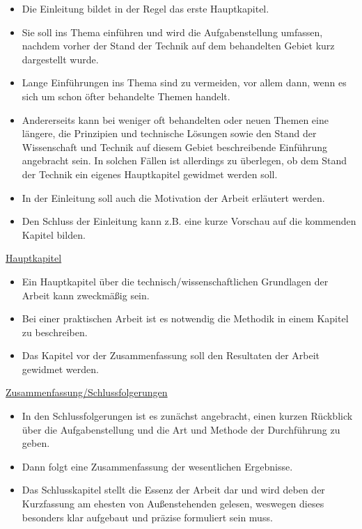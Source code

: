 \begin{itemize}
    \item Die Einleitung bildet in der Regel das erste Hauptkapitel.
    \item Sie soll ins Thema einführen und wird die Aufgabenstellung umfassen, nachdem vorher der Stand der Technik auf dem behandelten Gebiet kurz dargestellt wurde.
    \item Lange Einführungen ins Thema sind zu vermeiden, vor allem dann, wenn es sich um schon öfter behandelte Themen handelt.
    \item Andererseits kann bei weniger oft behandelten oder {\glqq}neuen{\grqq} Themen  eine längere, die Prinzipien und technische Lösungen sowie den Stand der Wissenschaft und Technik auf diesem Gebiet beschreibende Einführung angebracht sein. In solchen Fällen ist allerdings zu überlegen, ob dem Stand der Technik ein eigenes Hauptkapitel gewidmet werden soll.
    \item In der Einleitung soll auch die Motivation der Arbeit erläutert werden.
    \item Den Schluss der Einleitung kann z.B. eine kurze Vorschau auf die kommenden Kapitel bilden.
\end{itemize}

\newpage

\underline{Hauptkapitel}

\begin{itemize}
    \item Ein Hauptkapitel über die technisch/wissenschaftlichen Grundlagen der Arbeit kann zweckmäßig sein.
    \item Bei einer praktischen Arbeit ist es notwendig die Methodik in einem Kapitel zu beschreiben.
    \item Das Kapitel vor der Zusammenfassung soll den Resultaten der Arbeit gewidmet werden.
\end{itemize}

\vspace{5mm}

\underline{Zusammenfassung/Schlussfolgerungen}

\begin{itemize}
    \item In den Schlussfolgerungen ist es zunächst angebracht, einen kurzen Rückblick über die Aufgabenstellung und die Art und Methode der Durchführung zu geben.
    \item Dann folgt eine Zusammenfassung der wesentlichen Ergebnisse.
    \item Das Schlusskapitel stellt die Essenz der Arbeit dar und wird deben der Kurzfassung am ehesten von Außenstehenden gelesen, weswegen dieses besonders klar aufgebaut und präzise formuliert sein muss.
\end{itemize}

